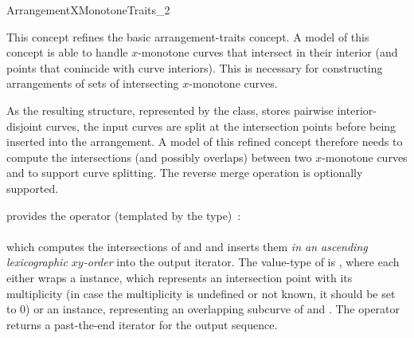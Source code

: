 
\ccRefPageBegin

\begin{ccRefConcept}{ArrangementXMonotoneTraits_2}

\ccThreeToTwo

\ccDefinition

This concept refines the basic arrangement-traits concept. A model of
this concept is able to handle $x$-monotone curves that intersect in
their interior (and points that conincide with curve interiors). This
is necessary for constructing arrangements of sets of intersecting
$x$-monotone curves.

As the resulting structure, represented by the  class,
stores pairwise interior-disjoint curves, the input curves are split at
the intersection points before being inserted into the arrangement. 
A model of this refined concept therefore needs to compute the intersections
(and possibly overlaps) between two $x$-monotone curves and to support
curve splitting. The reverse merge operation is optionally supported.

\ccRefines
{}



\ccTypes




\ccThreeToTwo

{provides the operator (templated by the  type)~: \\
  \\
 which computes the intersections of  and  and inserts them
 {\sl in an ascending lexicographic $xy$-order} into the output iterator.
 The value-type of  is , where each
  either wraps a  instance, which
 represents an intersection point with its multiplicity (in case the
 multiplicity is undefined or not known, it should be set to $0$) or an
  instance, representing an overlapping subcurve of
  and . The operator returns a past-the-end iterator
 for the output sequence.}


\end{ccRefConcept}
